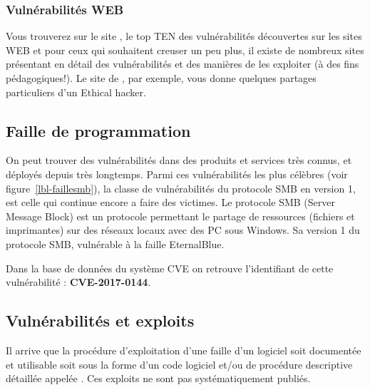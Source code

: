 

\subsubsection{Vulnérabilités WEB}

Vous trouverez sur le site , le top TEN des vulnérabilités découvertes sur les sites WEB
et pour ceux qui souhaitent creuser un peu plus, il existe de nombreux sites présentant en détail des vulnérabilités et des manières de les exploiter (à des fins pédagogiques!). Le site de , par exemple, vous donne quelques partages particuliers d'un Ethical hacker.

\subsection{Faille de programmation}

On peut trouver des vulnérabilités dans des produits et services très connus, et déployés depuis très longtemps. 
Parmi ces vulnérabilités les plus célèbres (voir figure~\ref{lbl-faillesmb}), la classe de vulnérabilités du protocole SMB en version 1, est celle qui continue encore a faire des victimes.
Le protocole SMB (Server Message Block) est un protocole permettant le partage de ressources (fichiers et imprimantes) sur des réseaux locaux avec des PC sous Windows. Sa version 1 du protocole SMB, vulnérable à la faille EternalBlue.

Dans la base de données du système CVE on retrouve l’identifiant de cette vulnérabilité : \textbf{CVE-2017-0144}. 


\subsection{Vulnérabilités et exploits}

Il arrive que la procédure d'exploitation d'une faille d'un logiciel soit  documentée et utilisable soit sous la forme d'un code logiciel et/ou de procédure descriptive détaillée appelée . Ces exploits ne sont pas systématiquement publiés.

